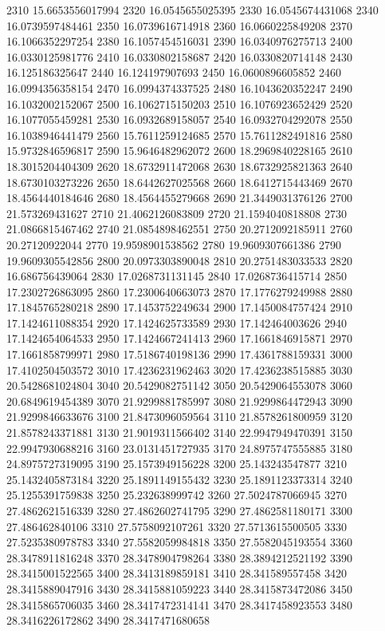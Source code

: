 {2310 15.6653556017994
2320 16.0545655025395
2330 16.0545674431068
2340 16.0739597484461
2350 16.0739616714918
2360 16.0660225849208
2370 16.1066352297254
2380 16.1057454516031
2390 16.0340976275713
2400 16.0330125981776
2410 16.0330802158687
2420 16.0330820714148
2430 16.125186325647
2440 16.124197907693
2450 16.0600896605852
2460 16.0994356358154
2470 16.0994374337525
2480 16.1043620352247
2490 16.1032002152067
2500 16.1062715150203
2510 16.1076923652429
2520 16.1077055459281
2530 16.0932689158057
2540 16.0932704292078
2550 16.1038946441479
2560 15.7611259124685
2570 15.7611282491816
2580 15.9732846596817
2590 15.9646482962072
2600 18.2969840228165
2610 18.3015204404309
2620 18.6732911472068
2630 18.6732925821363
2640 18.6730103273226
2650 18.6442627025568
2660 18.6412715443469
2670 18.4564440184646
2680 18.4564455279668
2690 21.3449031376126
2700 21.573269431627
2710 21.4062126083809
2720 21.1594040818808
2730 21.0866815467462
2740 21.0854898462551
2750 20.2712092185911
2760 20.27120922044
2770 19.9598901538562
2780 19.9609307661386
2790 19.9609305542856
2800 20.0973303890048
2810 20.2751483033533
2820 16.686756439064
2830 17.0268731131145
2840 17.0268736415714
2850 17.2302726863095
2860 17.2300640663073
2870 17.1776279249988
2880 17.1845765280218
2890 17.1453752249634
2900 17.1450084757424
2910 17.1424611088354
2920 17.1424625733589
2930 17.142464003626
2940 17.1424654064533
2950 17.1424667241413
2960 17.1661846915871
2970 17.1661858799971
2980 17.5186740198136
2990 17.4361788159331
3000 17.4102504503572
3010 17.4236231962463
3020 17.4236238515885
3030 20.5428681024804
3040 20.5429082751142
3050 20.5429064553078
3060 20.6849619454389
3070 21.9299881785997
3080 21.9299864472943
3090 21.9299846633676
3100 21.8473096059564
3110 21.8578261800959
3120 21.8578243371881
3130 21.9019311566402
3140 22.9947949470391
3150 22.9947930688216
3160 23.0131451727935
3170 24.8975747555885
3180 24.8975727319095
3190 25.1573949156228
3200 25.143243547877
3210 25.1432405873184
3220 25.1891149155432
3230 25.1891123373314
3240 25.1255391759838
3250 25.232638999742
3260 27.5024787066945
3270 27.4862621516339
3280 27.4862602741795
3290 27.4862581180171
3300 27.486462840106
3310 27.5758092107261
3320 27.5713615500505
3330 27.5235380978783
3340 27.5582059984818
3350 27.5582045193554
3360 28.3478911816248
3370 28.3478904798264
3380 28.3894212521192
3390 28.3415001522565
3400 28.3413189859181
3410 28.341589557458
3420 28.3415889047916
3430 28.3415881059223
3440 28.3415873472086
3450 28.3415865706035
3460 28.3417472314141
3470 28.3417458923553
3480 28.3416226172862
3490 28.3417471680658
}

